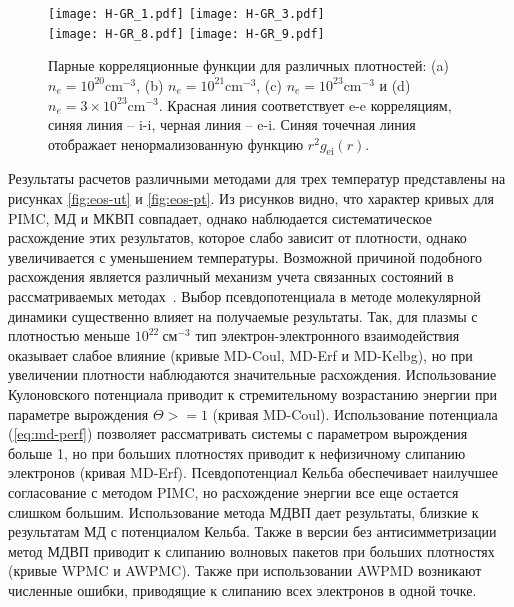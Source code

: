 \begin{figure}[ht!]
	\begin{center}
		\texttt{[image: H-GR\_1.pdf]}\qquad
		\texttt{[image: H-GR\_3.pdf]}\\
		\texttt{[image: H-GR\_8.pdf]}\qquad
		\texttt{[image: H-GR\_9.pdf]}
	\end{center}
	\caption{\label{fig:eos-rdf} Парные корреляционные функции для различных плотностей: (a) $n_e=10^{20} \mathrm{cm}^{-3}$,
		(b) $n_e=10^{21} \mathrm{cm}^{-3}$, (c) $n_e=10^{23} \mathrm{cm}^{-3}$ и (d) $n_e=3\times10^{23} \mathrm{cm}^{-3}$.
		Красная линия соответствует e-e корреляциям, синяя линия -- i-i, черная линия -- e-i. Синяя точечная линия отображает ненормализованную функцию  $r^2 g_\mathrm{ei}(r)$.}
\end{figure}

Результаты расчетов различными методами для трех температур представлены на рисунках \ref{fig:eos-ut} и \ref{fig:eos-pt}.
Из рисунков видно, что характер кривых для PIMC, МД и МКВП совпадает, однако наблюдается систематическое расхождение этих результатов, которое слабо зависит от плотности, однако увеличивается с уменьшением температуры. Возможной причиной подобного расхождения является различный механизм учета связанных состояний в рассматриваемых методах~\cite{lankin2009crossover}. Выбор псевдопотенциала в методе молекулярной динамики существенно влияет на получаемые результаты. Так, для плазмы с плотностью меньше $10^{22}~\text{см}^{-3}$ тип электрон-электронного взаимодействия оказывает слабое влияние (кривые MD-Coul, MD-Erf и MD-Kelbg), но при увеличении плотности наблюдаются значительные расхождения. Использование Кулоновского потенциала приводит к стремительному возрастанию энергии при параметре вырождения $\Theta>=1$ (кривая MD-Coul). Использование потенциала (\ref{eq:md-perf}) позволяет рассматривать системы с параметром вырождения больше 1, но при больших плотностях приводит к нефизичному слипанию электронов (кривая MD-Erf). Псевдопотенциал Кельба обеспечивает наилучшее согласование с методом PIMC, но расхождение энергии все еще остается слишком большим. Использование метода МДВП дает результаты, близкие к результатам МД с потенциалом Кельба. Также в версии без антисимметризации метод МДВП приводит к слипанию волновых пакетов при больших плотностях (кривые WPMC и AWPMC). Также при использовании AWPMD возникают численные ошибки, приводящие к слипанию всех электронов в одной точке. 

